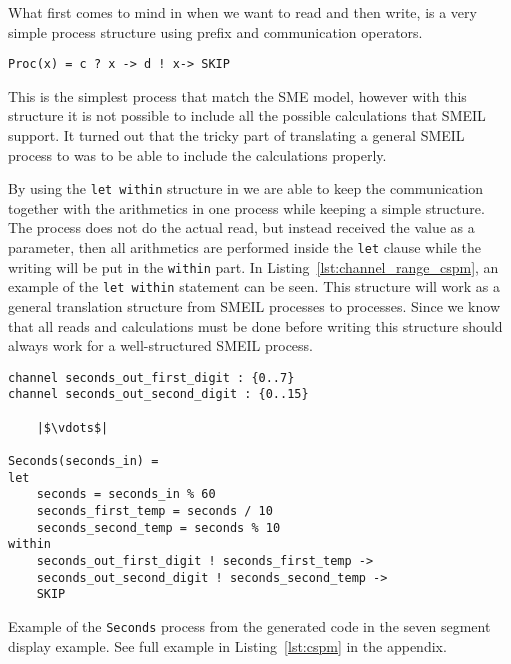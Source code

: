 What first comes to mind in \cspm{} when we want to read and then write, is a very simple process structure using prefix and communication operators.
\begin{verbatim}
Proc(x) = c ? x -> d ! x-> SKIP
\end{verbatim}
This is the simplest \cspm{} process that match the SME model, however with this structure it is not possible to include all the possible calculations that SMEIL support. It turned out that the tricky part of translating a general SMEIL process to \cspm{} was to be able to include the calculations properly.

By using the \texttt{let within} structure in \cspm{} we are able to keep the communication together with the arithmetics in one \cspm{} process while keeping a simple structure. The \cspm{} process does not do the actual read, but instead received the value as a parameter, then all arithmetics are performed inside the \texttt{let} clause while the writing will be put in the \texttt{within} part.
In Listing~\ref{lst:channel_range_cspm}, an example of the \texttt{let within} statement can be seen. This structure will work as a general translation structure from SMEIL processes to \cspm{} processes. Since we know that all reads and calculations must be done before writing this structure should always work for a well-structured SMEIL process.

\begin{listing}
\begin{verbatim}
channel seconds_out_first_digit : {0..7}
channel seconds_out_second_digit : {0..15}

    |$\vdots$|

Seconds(seconds_in) =
let
    seconds = seconds_in % 60
    seconds_first_temp = seconds / 10
    seconds_second_temp = seconds % 10
within
    seconds_out_first_digit ! seconds_first_temp ->
    seconds_out_second_digit ! seconds_second_temp ->
    SKIP
\end{verbatim}
\caption{Example of the \texttt{Seconds} process from the generated \cspm{} code in the seven segment display example. See full example in Listing~\ref{lst:cspm} in the appendix.}
\label{lst:channel_range_cspm}
\end{listing}

